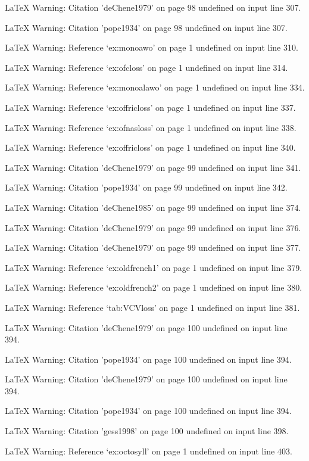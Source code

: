 LaTeX Warning: Citation 'deChene1979' on page 98 undefined on input line 307.


LaTeX Warning: Citation 'pope1934' on page 98 undefined on input line 307.


LaTeX Warning: Reference `ex:monoawo' on page 1 undefined on input line 310.


LaTeX Warning: Reference `ex:ofcloss' on page 1 undefined on input line 314.


LaTeX Warning: Reference `ex:monoalawo' on page 1 undefined on input line 334.


LaTeX Warning: Reference `ex:offricloss' on page 1 undefined on input line 337.


LaTeX Warning: Reference `ex:ofnasloss' on page 1 undefined on input line 338.


LaTeX Warning: Reference `ex:offricloss' on page 1 undefined on input line 340.


LaTeX Warning: Citation 'deChene1979' on page 99 undefined on input line 341.


LaTeX Warning: Citation 'pope1934' on page 99 undefined on input line 342.


LaTeX Warning: Citation 'deChene1985' on page 99 undefined on input line 374.


LaTeX Warning: Citation 'deChene1979' on page 99 undefined on input line 376.


LaTeX Warning: Citation 'deChene1979' on page 99 undefined on input line 377.


LaTeX Warning: Reference `ex:oldfrench1' on page 1 undefined on input line 379.


LaTeX Warning: Reference `ex:oldfrench2' on page 1 undefined on input line 380.


LaTeX Warning: Reference `tab:VCVloss' on page 1 undefined on input line 381.


LaTeX Warning: Citation 'deChene1979' on page 100 undefined on input line 394.


LaTeX Warning: Citation 'pope1934' on page 100 undefined on input line 394.


LaTeX Warning: Citation 'deChene1979' on page 100 undefined on input line 394.


LaTeX Warning: Citation 'pope1934' on page 100 undefined on input line 394.


LaTeX Warning: Citation 'gess1998' on page 100 undefined on input line 398.


LaTeX Warning: Reference `ex:octosyll' on page 1 undefined on input line 403.


